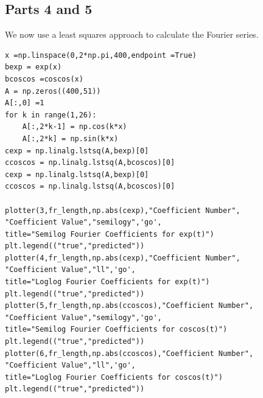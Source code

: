 \documentclass[11pt, a4paper]{article}
\begin{document}
\subsection{Parts 4 and 5}
We now use a least squares approach to calculate the Fourier series.
\begin{verbatim}
x =np.linspace(0,2*np.pi,400,endpoint =True)
bexp = exp(x)
bcoscos =coscos(x)
A = np.zeros((400,51))
A[:,0] =1
for k in range(1,26):
    A[:,2*k-1] = np.cos(k*x)
    A[:,2*k] = np.sin(k*x)
cexp = np.linalg.lstsq(A,bexp)[0]
ccoscos = np.linalg.lstsq(A,bcoscos)[0]
cexp = np.linalg.lstsq(A,bexp)[0]
ccoscos = np.linalg.lstsq(A,bcoscos)[0]

plotter(3,fr_length,np.abs(cexp),"Coefficient Number",
"Coefficient Value","semilogy",'go',
title="Semilog Fourier Coefficients for exp(t)")
plt.legend(("true","predicted"))
plotter(4,fr_length,np.abs(cexp),"Coefficient Number",
"Coefficient Value","ll",'go',
title="Loglog Fourier Coefficients for exp(t)")
plt.legend(("true","predicted"))
plotter(5,fr_length,np.abs(ccoscos),"Coefficient Number",
"Coefficient Value","semilogy",'go',
title="Semilog Fourier Coefficients for coscos(t)")
plt.legend(("true","predicted"))
plotter(6,fr_length,np.abs(ccoscos),"Coefficient Number",
"Coefficient Value","ll",'go',
title="Loglog Fourier Coefficients for coscos(t)")
plt.legend(("true","predicted"))
\end{verbatim}
\end{document}
